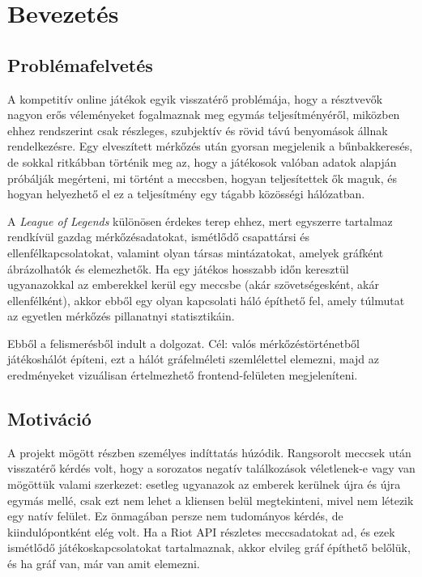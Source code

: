 \chapter{Bevezetés}

\section{Problémafelvetés}

A kompetitív online játékok egyik visszatérő problémája, hogy a résztvevők nagyon erős véleményeket fogalmaznak meg egymás teljesítményéről, miközben ehhez rendszerint csak részleges, szubjektív és rövid távú benyomások állnak rendelkezésre. Egy elveszített mérkőzés után gyorsan megjelenik a bűnbakkeresés, de sokkal ritkábban történik meg az, hogy a játékosok valóban adatok alapján próbálják megérteni, mi történt a meccsben, hogyan teljesítettek ők maguk, és hogyan helyezhető el ez a teljesítmény egy tágabb közösségi hálózatban.

A \emph{League of Legends} különösen érdekes terep ehhez, mert egyszerre tartalmaz rendkívül gazdag mérkőzésadatokat, ismétlődő csapattársi és ellenfélkapcsolatokat, valamint olyan társas mintázatokat, amelyek gráfként ábrázolhatók és elemezhetők. Ha egy játékos hosszabb időn keresztül ugyanazokkal az emberekkel kerül egy meccsbe (akár szövetségesként, akár ellenfélként), akkor ebből egy olyan kapcsolati háló építhető fel, amely túlmutat az egyetlen mérkőzés pillanatnyi statisztikáin.

Ebből a felismerésből indult a dolgozat. Cél: valós mérkőzéstörténetből játékoshálót építeni, ezt a hálót gráfelméleti szemlélettel elemezni, majd az eredményeket vizuálisan értelmezhető frontend-felületen megjeleníteni.

\section{Motiváció}

A projekt mögött részben személyes indíttatás húzódik. Rangsorolt meccsek után visszatérő kérdés volt, hogy a sorozatos negatív találkozások véletlenek-e vagy van mögöttük valami szerkezet: esetleg ugyanazok az emberek kerülnek újra és újra egymás mellé, csak ezt nem lehet a kliensen belül megtekinteni, mivel nem létezik egy natív felület. Ez önmagában persze nem tudományos kérdés, de kiindulópontként elég volt. Ha a Riot API részletes meccsadatokat ad, és ezek ismétlődő játékoskapcsolatokat tartalmaznak, akkor elvileg gráf építhető belőlük, és ha gráf van, már van amit elemezni.

